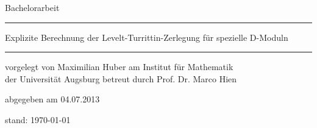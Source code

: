 \begin{titlepage}
  \thispagestyle{empty}
  \newcommand{\Rule}{\rule{\textwidth}{1mm}}
  \begin{center}\sffamily
    \normalfont\sffamily\large
    Bachelorarbeit
    \Rule
    \vspace{5mm}
    \Huge{Explizite Berechnung der Levelt-Turrittin-Zerlegung für spezielle
      D-Moduln}
    \vspace{1mm}
    \Rule
  \end{center}
    \vfill
    \normalfont\sffamily\large vorgelegt von
    \Large Maximilian Huber
    \vfill
    \normalfont\sffamily\large am
    \Large Institut für Mathematik\\
    \normalfont\sffamily\large der
    \Large Universität Augsburg
    \vfill
    \normalfont\sffamily\large betreut durch 
    \Large Prof. Dr. Marco Hien \par
    \vfill
    \normalfont\sffamily\large abgegeben am 
    \Large 04.07.2013\\
  \ifnum{}
    \begin{center}
      \normalfont\sffamily\large stand: \today
    \end{center}
  \fi
\end{titlepage}
